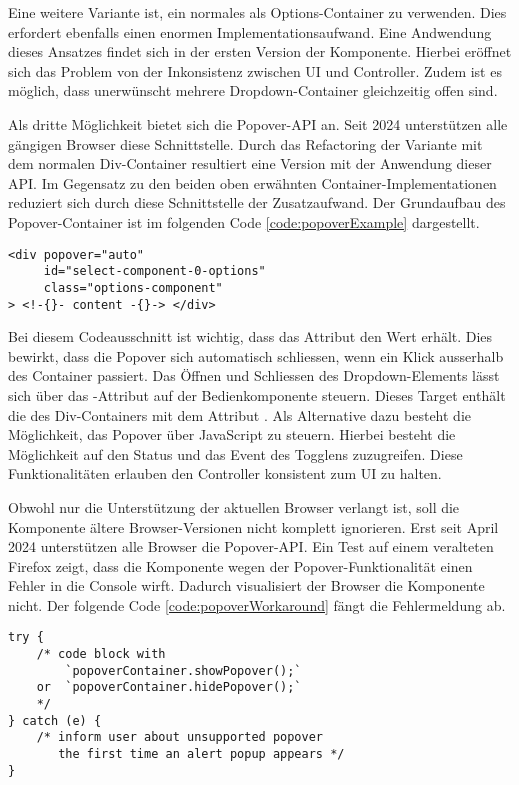 Eine weitere Variante ist, ein normales  als Options-Container zu verwenden. 
Dies erfordert ebenfalls einen enormen Implementationsaufwand. 
Eine Andwendung dieses Ansatzes findet sich in der ersten Version der Komponente. 
Hierbei eröffnet sich das Problem von der Inkonsistenz zwischen UI und Controller. 
Zudem ist es möglich, dass unerwünscht mehrere Dropdown-Container gleichzeitig offen sind. 

Als dritte Möglichkeit bietet sich die Popover-API an. 
Seit 2024 unterstützen alle gängigen Browser diese Schnittstelle. 
Durch das Refactoring der Variante mit dem normalen Div-Container resultiert eine Version mit der Anwendung dieser API. 
Im Gegensatz zu den beiden oben erwähnten Container-Implementationen reduziert sich durch diese Schnittstelle der Zusatzaufwand. 
Der Grundaufbau des Popover-Container ist im folgenden Code \ref{code:popoverExample} dargestellt. 

\begin{lstlisting}[style = htmlcssjs, caption = Popover-Container Beispiel, label = code:popoverExample]
<div popover="auto"
     id="select-component-0-options" 
     class="options-component" 
> <!-{}- content -{}-> </div>
\end{lstlisting}

Bei diesem Codeausschnitt ist wichtig, dass das Attribut  den Wert  erhält. 
Dies bewirkt, dass die Popover sich automatisch schliessen, wenn ein Klick ausserhalb des Container passiert. 
Das Öffnen und Schliessen des Dropdown-Elements lässt sich über das -Attribut auf der Bedienkomponente steuern. 
Dieses Target enthält die  des Div-Containers mit dem Attribut . 
Als Alternative dazu besteht die Möglichkeit, das Popover über JavaScript zu steuern. 
Hierbei besteht die Möglichkeit auf den Status und das Event des Togglens zuzugreifen. 
Diese Funktionalitäten erlauben den Controller konsistent zum UI zu halten. 

Obwohl nur die Unterstützung der aktuellen Browser verlangt ist, soll die Komponente ältere Browser-Versionen nicht komplett ignorieren. 
Erst seit April 2024 unterstützen alle Browser die Popover-API. 
Ein Test auf einem veralteten Firefox zeigt, dass die Komponente wegen der Popover-Funktionalität einen Fehler in die Console wirft.
Dadurch visualisiert der Browser die Komponente nicht. 
Der folgende Code \ref{code:popoverWorkaround} fängt die Fehlermeldung ab. 

\begin{lstlisting}[style = htmlcssjs, caption = Workaround für ältere Browser, label = code:popoverWorkaround]
try {
    /* code block with 
        `popoverContainer.showPopover();`
    or  `popoverContainer.hidePopover();`
    */
} catch (e) {
    /* inform user about unsupported popover 
       the first time an alert popup appears */
}
\end{lstlisting}

